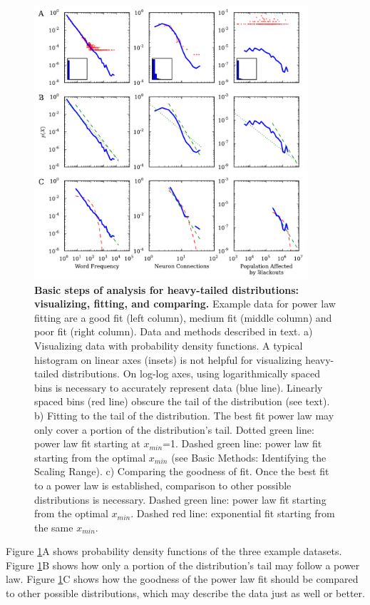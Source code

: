 \documentclass[10pt]{article}
\begin{document}
\begin{figure}[!ht]
\begin{center}
\includegraphics[width=4in]{FigWorkflow.pdf}
\end{center}
\caption{
{\bf Basic steps of analysis for heavy-tailed distributions: visualizing, fitting, and comparing.} Example data for power law fitting are a good fit (left column), medium fit (middle column) and poor fit (right column). Data and methods described in text.
a) Visualizing data with probability density functions. A typical histogram on linear axes (insets) is not helpful for visualizing heavy-tailed distributions. On log-log axes, using logarithmically spaced bins is necessary to accurately represent data (blue line). Linearly spaced bins (red line) obscure the tail of the distribution (see text).
b) Fitting to the tail of the distribution. The best fit power law may only cover a portion of the distribution's tail. Dotted green line: power law fit starting at $x_{min}$=1. Dashed green line: power law fit starting from the optimal $x_{min}$ (see Basic Methods: Identifying the Scaling Range). 
c) Comparing the goodness of fit. Once the best fit to a power law is established, comparison to other possible distributions is necessary.  Dashed green line: power law fit starting from the optimal $x_{min}$. Dashed red line: exponential fit starting from the same $x_{min}$.
}
\label{Workflow}
\end{figure}

Figure \ref{Workflow}A shows probability density functions of the three example datasets. Figure \ref{Workflow}B shows how only a portion of the distribution's tail may follow a power law. Figure \ref{Workflow}C shows how the goodness of the power law fit should be compared to other possible distributions, which may describe the data just as well or better.
\end{document}
